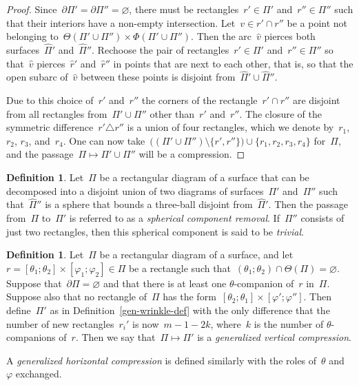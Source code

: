\documentclass{amsart}
\theoremstyle{theorem}
\theoremstyle{remark}
\theoremstyle{definition}
\newtheorem{defi}[theo]{Definition}
\numberwithin{equation}{section}
\numberwithin{figure}{section}
\begin{document}
\begin{proof}
Since~$\partial\Pi'=\partial\Pi''=\varnothing$, there must be rectangles~$r'\in\Pi'$ and~$r''\in\Pi''$
such that their interiors have a non-empty intersection. Let~$v\in r'\cap r''$ be a point
not belonging to~$\Theta(\Pi'\cup\Pi'')\times\Phi(\Pi'\cup\Pi'')$. Then the arc~$\widehat v$
pierces both surfaces~$\widehat\Pi'$ and~$\widehat\Pi''$. Rechoose
the pair of rectangles~$r'\in\Pi'$ and~$r''\in\Pi''$ so that~$\widehat v$ pierces~$\widehat r'$
and~$\widehat r''$ in points that are next to each other, that is, so that
the open subarc of~$\widehat v$ between these points is disjoint from~$\widehat\Pi'\cup\widehat\Pi''$.

Due to this choice of~$r'$ and~$r''$ the corners of the rectangle~$r'\cap r''$
are disjoint from all rectangles from~$\Pi'\cup\Pi''$ other than~$r'$ and~$r''$.
The closure of the symmetric difference~$r'\triangle r''$ is a union of four
rectangles, which we denote by~$r_1$, $r_2$, $r_3$, and~$r_4$. One can
now take~$\bigl((\Pi'\cup\Pi'')\setminus\{r',r''\}\bigr)\cup\{r_1,r_2,r_3,r_4\}$
for~$\Pi$, and the passage~$\Pi\mapsto\Pi'\cup\Pi''$ will be a compression.
\end{proof}

\begin{defi}
Let~$\Pi$ be a rectangular diagram of a surface that can be decomposed into a disjoint
union of two diagrams of surfaces~$\Pi'$ and~$\Pi''$ such that~$\widehat\Pi''$
is a sphere that bounds a three-ball disjoint from~$\widehat\Pi'$.
Then the passage from~$\Pi$ to~$\Pi'$ is referred to as a \emph{spherical component removal}.
If~$\Pi''$ consists of just two rectangles, then this spherical component is
said to be \emph{trivial}.
\end{defi}

\begin{defi}\label{gen-compres-def}
Let~$\Pi$ be a rectangular diagram of a surface, and let~$r=[\theta_1;\theta_2]\times[\varphi_1;\varphi_2]\in\Pi$
be a rectangle such that~$(\theta_1;\theta_2)\cap\Theta(\Pi)=\varnothing$. Suppose that~$\partial\Pi=\varnothing$
and that there is at least one $\theta$-companion of~$r$ in~$\Pi$. Suppose also that
no rectangle of~$\Pi$ has the form~$[\theta_2;\theta_1]\times[\varphi';\varphi'']$. Then define~$\Pi'$ as in Definition~\ref{gen-wrinkle-def}
with the only difference that the number of new rectangles~$r_i'$ is now~$m-1-2k$, where~$k$ is the number
of $\theta$-companions of~$r$. Then we say that~$\Pi\mapsto\Pi'$ is a \emph{generalized
vertical compression}.

A \emph{generalized horizontal compression} is defined similarly with the roles of~$\theta$ and~$\varphi$
exchanged.
\end{defi}
\end{document}
